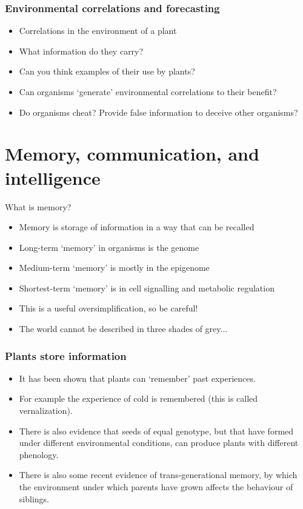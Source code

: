 \documentclass[10pt]{beamer}
\begin{document}
\begin{frame}
  \frametitle{Environmental correlations and forecasting \Discussion}
  \begin{itemize}
    \item Correlations in the environment of a plant
    \item What information do they carry?
    \item Can you think examples of their use by plants?
    \item Can organisms `generate' environmental correlations to their benefit?
    \item Do organisms cheat? Provide false information to deceive other organisms?
  \end{itemize}
\end{frame}

\section{Memory, communication, and intelligence}

\begin{frame}{What is memory?}
\begin{itemize}
  \item Memory is storage of information in a way that can be recalled
  \item Long-term `memory' in organisms is the genome
  \item Medium-term `memory' is mostly in the epigenome
  \item Shortest-term `memory' is in cell signalling and metabolic regulation
  \item This is a useful oversimplification, so be careful!
  \item The world cannot be described in three shades of grey...
\end{itemize}
\end{frame}

\begin{frame}
\frametitle{Plants store information}
  \begin{itemize}
    \item It has been shown that plants can `remember' past experiences.
    \item For example the experience of cold is remembered (this is called vernalization).
    \item There is also evidence that seeds of equal genotype, but that have formed under different environmental conditions, can produce plants with different phenology.
    \item There is also some recent evidence of trans-generational memory, by which the environment under which parents have grown affects the behaviour of siblings.
  \end{itemize}
\end{frame}
\end{document}
